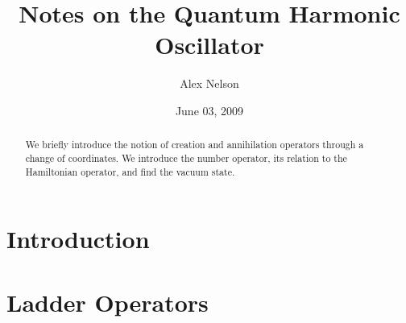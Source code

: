 \documentclass[draft]{amsart}
\title{Notes on the Quantum Harmonic Oscillator}
\date{June 03, 2009}
\author{Alex Nelson}
\numberwithin{equation}{section}
\theoremstyle{definition}
\begin{document}
\begin{abstract}
We briefly introduce the notion of creation and annihilation
operators through a change of coordinates. We introduce the
number operator, its relation to the Hamiltonian operator, and
find the vacuum state.
\end{abstract}
\maketitle
\section{Introduction}

\section{Ladder Operators}

\nocite{sakurai}


\end{document}
